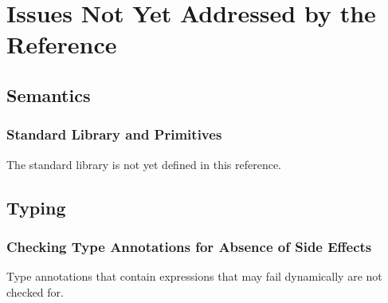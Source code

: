 
\chapter{Issues Not Yet Addressed by the Reference\label{appendix:MissingTransliteration}}
\section{Semantics}

\subsection{Standard Library and Primitives}

The standard library is not yet defined in this reference.


\section{Typing}

\subsection{Checking Type Annotations for Absence of Side Effects}
Type annotations that contain expressions that may fail dynamically are not checked for.


